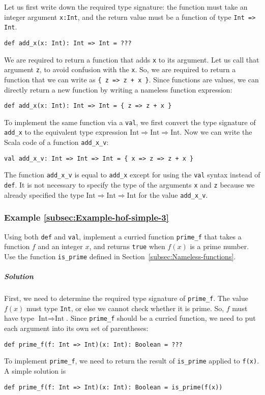 Let us first write down the required type signature: the function
must take an integer argument \lstinline!x:Int!, and the return value
must be a function of type \lstinline!Int => Int!.
\begin{lstlisting}
def add_x(x: Int): Int => Int = ???
\end{lstlisting}
We are required to return a function that adds \lstinline!x! to its
argument. Let us call that argument \lstinline!z!, to avoid confusion
with the \lstinline!x!. So, we are required to return a function
that we can write as \lstinline!{ z => z + x }!. Since functions
are values, we can directly return a new function by writing a nameless
function expression:
\begin{lstlisting}
def add_x(x: Int): Int => Int = { z => z + x }
\end{lstlisting}

To implement the same function via a \lstinline!val!, we first convert
the type signature of \lstinline!add_x! to the equivalent type expression
$\text{Int}\Rightarrow\text{Int}\Rightarrow\text{Int}$. Now we can
write the Scala code of a function \lstinline!add_x_v!:
\begin{lstlisting}
val add_x_v: Int => Int => Int = { x => z => z + x }
\end{lstlisting}
The function \lstinline!add_x_v! is equal to \lstinline!add_x! except
for using the \lstinline!val! syntax instead of \lstinline!def!.
It is not necessary to specify the type of the arguments \lstinline!x!
and \lstinline!z! because we already specified the type $\text{Int}\Rightarrow\text{Int}\Rightarrow\text{Int}$
for the value \lstinline!add_x_v!. 

\subsubsection{Example \label{subsec:Example-hof-simple-3}\ref{subsec:Example-hof-simple-3}}

Using both \lstinline!def! and \lstinline!val!, implement a curried
function \lstinline!prime_f! that takes a function $f$ and an integer
$x$, and returns \lstinline!true! when $f(x)$ is a prime number.
Use the function \lstinline!is_prime! defined in Section~\ref{subsec:Nameless-functions}. 

\subparagraph{Solution}

First, we need to determine the required type signature of \lstinline!prime_f!.
The value $f(x)$ must type \lstinline!Int!, or else we cannot check
whether it is prime. So, $f$ must have type $\text{Int}\Rightarrow\text{Int}$.
Since \lstinline!prime_f! should be a curried function, we need to
put each argument into its own set of parentheses:
\begin{lstlisting}
def prime_f(f: Int => Int)(x: Int): Boolean = ???
\end{lstlisting}
To implement \lstinline!prime_f!, we need to return the result of
\lstinline!is_prime! applied to \lstinline!f(x)!. A simple solution
is
\begin{lstlisting}
def prime_f(f: Int => Int)(x: Int): Boolean = is_prime(f(x))
\end{lstlisting}

